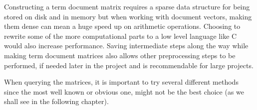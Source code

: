 Constructing a term document matrix requires a sparse data structure
for being stored on disk and in memory but when working with document
vectors, making them dense can mean a huge speed up on arithmetic
operations. Choosing to rewrite some of the more computational parts
to a low level language like C would also increase performance. Saving
intermediate steps along the way while making term document matrices
also allows other preprocessing steps to be performed, if needed later
in the project and is recommendable for large projects.

When querying the matrices, it is important to try several different
methods since the most well known or obvious one, might not be the
best choice (as we shall see in the following chapter).
